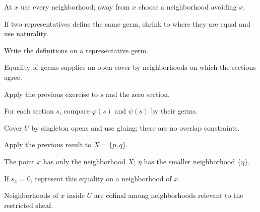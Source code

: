 \begin{hint}
At $x$ use every neighborhood; away from $x$ choose a neighborhood avoiding $x$.
\end{hint}

\begin{hint}
If two representatives define the same germ, shrink to where they are equal and use naturality.
\end{hint}

\begin{hint}
Write the definitions on a representative germ.
\end{hint}

\begin{hint}
Equality of germs supplies an open cover by neighborhoods on which the sections agree.
\end{hint}

\begin{hint}
Apply the previous exercise to $s$ and the zero section.
\end{hint}

\begin{hint}
For each section $s$, compare $\varphi(s)$ and $\psi(s)$ by their germs.
\end{hint}

\begin{hint}
Cover $U$ by singleton opens and use gluing; there are no overlap constraints.
\end{hint}

\begin{hint}
Apply the previous result to $X=\{p,q\}$.
\end{hint}

\begin{hint}
The point $x$ has only the neighborhood $X$; $\eta$ has the smaller neighborhood $\{\eta\}$.
\end{hint}

\begin{hint}
If $s_x=0$, represent this equality on a neighborhood of $x$.
\end{hint}

\begin{hint}
Neighborhoods of $x$ inside $U$ are cofinal among neighborhoods relevant to the restricted sheaf.
\end{hint}


